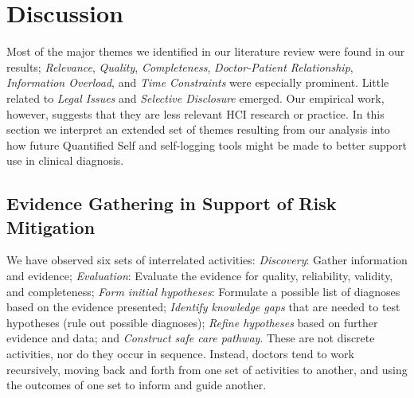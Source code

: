 \documentclass{sigchi}
\begin{document}



\section{Discussion}

Most of the major themes we identified in our literature review were found in our results; \emph{Relevance}, \emph{Quality}, \emph{Completeness}, \emph{Doctor-Patient Relationship}, \emph{Information Overload}, and \emph{Time Constraints} were especially prominent. Little related to \emph{Legal Issues} and \emph{Selective Disclosure} emerged. Our empirical work, however, suggests that they are less relevant HCI research or practice. In this section we interpret an extended set of  themes resulting from our analysis into how future Quantified Self and self-logging tools might be made to better support use in clinical diagnosis. %


\subsection{Evidence Gathering in Support of Risk Mitigation} %
\label{sec:riskmit}

We have observed six sets of interrelated activities: \emph{Discovery}: Gather information and evidence; \emph{Evaluation}: Evaluate the evidence for quality, reliability, validity, and completeness; \emph{Form initial hypotheses}: Formulate a possible list of diagnoses based on the evidence presented; \emph{Identify knowledge gaps} that are needed to test hypotheses (rule out possible diagnoses); \emph{Refine hypotheses} based on further evidence and data; and \emph{Construct safe care pathway}.  These are not discrete activities, nor do they occur in sequence.  Instead, doctors tend to work recursively, moving back and forth from one set of activities to another, and using the outcomes of one set to inform and guide another.
\end{document}
